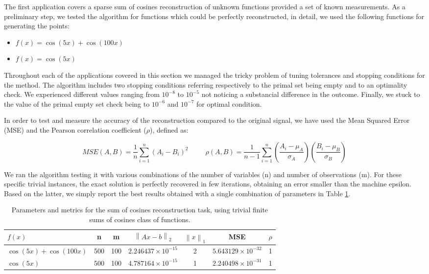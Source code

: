 \documentclass[journal,article,submit,electronics,pdftex]{Definitions/mdpi}
\newcommand{\norm}[1]{\left\lVert#1\right\rVert}
\begin{document}
{The first application covers a sparse sum of cosines reconstruction of unknown functions provided a set of known measurements. As a preliminary step, we tested the algorithm for functions which could be perfectly reconstructed, in detail, we used the following functions for generating the points:

\begin{itemize}
  \item $f(x) = \cos(5x) + \cos(100x)$
  \item $f(x) = \cos(5x)$
\end{itemize}

Throughout each of the applications covered in this section we managed the tricky problem of tuning tolerances and stopping conditions for the method. The algorithm includes two stopping conditions referring respectively to the primal set being empty and to an optimality check. We experienced different values ranging from $10^{-8}$ to $10^{-5}$ not noticing a substancial difference in the outcome. Finally, we stuck to the value of the primal empty set check being to $10^{-6}$ and $10^{-7}$ for optimal condition. 


In order to test and measure the accuracy of the reconstruction compared to the original signal, we have used the Mean Squared Error (MSE) and the Pearson correlation coefficient ($\rho$), defined as:

\begin{equation}
    MSE(A,B) = \frac{1}{n}\sum_{i=1}^n{(A_i - B_i)^2} \hspace{30pt}
    \rho(A,B) = \frac{1}{n-1}\sum_{i=1}^n{(\frac{A_i - \mu_A}{\sigma_A})}{(\frac{B_i - \mu_B}{\sigma_B})}
\end{equation}

We ran the algorithm testing it with various combinations of the number of variables (n) and number of observations (m).
For these specific trivial instances, the exact solution is perfectly recovered in few iterations, obtaining an error smaller than the machine epsilon. Based on the latter, we simply report the best results obtained with a single combination of parameters in Table \ref{table:cos_results}.

\begin{table}[htb]
    \centering
    \begin{tabular}{lcccccc}
        \toprule
        $f(x)$ & n & m & $\norm{Ax-b}_2$ & $\norm{x}_1$ & MSE & $\rho$ \\
        \midrule
        $\cos(5x) + \cos(100x)$ & 500 & 100 & $2.246437 \times 10^{-15}$ & 2 & $5.643129\times 10^{-32}$ & 1 \\
        $\cos(5x)$ & 500 & 100 & $4.787164 \times 10^{-15}$ & 1 & $2.240498\times 10^{-31}$ & 1 \\
        \bottomrule
    \end{tabular}
    \caption{Parameters and metrics for the sum of cosines reconstruction task, using trivial finite sums of cosines class of functions.}
    \label{table:cos_results}
\end{table}

}
\end{document}
